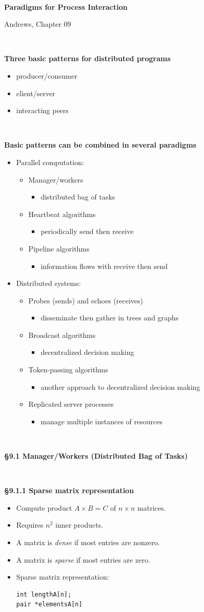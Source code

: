 \documentclass{article}
\newcommand{\bi}{\begin{itemize}}
\newcommand{\ii}{\item}
\newcommand{\ei}{\end{itemize}}
\newcommand{\ti}[1]{
\newpage
\mbox{~}

\vspace{1.25in}
\centerline{\bf #1}
}
\begin{document}
\huge\sf

\ti{Paradigms for Process Interaction}
\centerline{Andrews, Chapter 09}

\ti{Three basic patterns for distributed programs}
\bi
\ii producer/consumer
\ii client/server
\ii interacting peers
\ei

\ti{Basic patterns can be combined in several paradigms}
\bi
\ii Parallel computation:
\bi
\ii Manager/workers 
  \bi\ii distributed bag of tasks\ei
\ii Heartbeat algorithms
  \bi\ii periodically send then receive\ei
\ii Pipeline algorithms
  \bi\ii information flows with receive then send\ei
\ei
\ii Distributed systems:
\bi
\ii Probes (sends) and echoes (receives)
  \bi\ii disseminate then gather in trees and graphs\ei
\ii Broadcast algorithms
  \bi\ii decentralized decision making \ei
\ii Token-passing algorithms
  \bi\ii another approach to decentralized decision making\ei
\ii Replicated server processes
  \bi\ii manage multiple instances of resources\ei
\ei
\ei


\ti{\S 9.1 Manager/Workers (Distributed Bag of Tasks)}

\ti{\S 9.1.1 Sparse matrix representation}

\bi
\ii Compute product $A\times B = C$ of $n\times n$ matrices.
\ii Requires $n^2$ inner products.
\ii A matrix is {\em dense} if most entries are nonzero.
\ii A matrix is {\em sparse} if most entries are zero.
\ii Sparse matrix representation:
\begin{multicols}{2}
\begin{Verbatim}
int lengthA[n];
pair *elementsA[n]
\end{Verbatim}
\columnbreak
\rule{0cm}{1cm}
\end{multicols}
\ei
\end{document}
